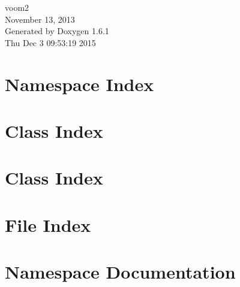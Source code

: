 \documentclass[a4paper]{book}
\begin{document}
\hypersetup{pageanchor=false}
\begin{titlepage}
\vspace*{7cm}
\begin{center}
{\Large voom2 \\[1ex]\large November 13, 2013 }\\
\vspace*{1cm}
{\large Generated by Doxygen 1.6.1}\\
\vspace*{0.5cm}
{\small Thu Dec 3 09:53:19 2015}\\
\end{center}
\end{titlepage}
\clearemptydoublepage
{}
\tableofcontents
\clearemptydoublepage
{}
\hypersetup{pageanchor=true}
\chapter{Namespace Index}

\chapter{Class Index}

\chapter{Class Index}

\chapter{File Index}

\chapter{Namespace Documentation}

\end{document}
